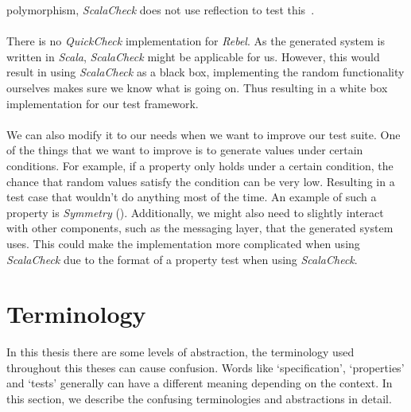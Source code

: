 polymorphism, \textit{ScalaCheck} does not use reflection to test
this~\cite{kang2011fortresscheck}.\\
\\
There is no \textit{QuickCheck} implementation for \textit{Rebel}. As the
generated system is written in \textit{Scala}, \textit{ScalaCheck} might be
applicable for us. However, this would result in using \textit{ScalaCheck} as a
black box, implementing the random functionality ourselves makes sure we know
what is going on. Thus resulting in a white box implementation for our test
framework.\\
\\
We can also modify it to our needs when we want to improve our test suite. One
of the things that we want to improve is to generate values under certain
conditions. For example, if a property only holds under a certain condition, the
chance that random values satisfy the condition can be very low. Resulting in a
test case that wouldn't do anything most of the time. An example of such a
property is \textit{Symmetry} (). %
Additionally, we might also need to slightly interact with other components,
such as the messaging layer, that the generated system uses. This could make the
implementation more complicated when using \textit{ScalaCheck} due to the format
of a property test when using \textit{ScalaCheck}.

\section{Terminology}
In this thesis there are some levels of abstraction, the terminology used
throughout this theses can cause confusion. Words like `specification',
`properties' and `tests' generally can have a different meaning depending on the
context. In this section, we describe the confusing terminologies and
abstractions in detail.

